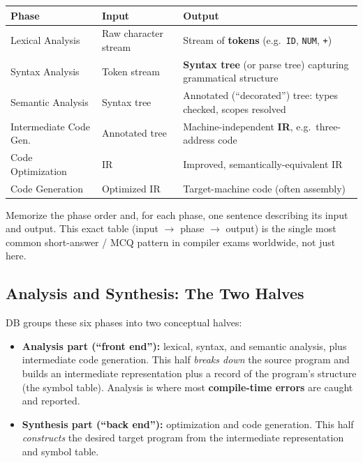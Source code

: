 \documentclass[11pt]{article}
\begin{document}
\begin{center}
\renewcommand{\arraystretch}{1.3}
\begin{tabularx}{\textwidth}{@{}l l X@{}}
\toprule
\textbf{Phase} & \textbf{Input} & \textbf{Output} \\
\midrule
Lexical Analysis & Raw character stream & Stream of \textbf{tokens} (e.g.\ \texttt{ID}, \texttt{NUM}, \texttt{+}) \\
Syntax Analysis & Token stream & \textbf{Syntax tree} (or parse tree) capturing grammatical structure \\
Semantic Analysis & Syntax tree & Annotated (``decorated'') tree: types checked, scopes resolved \\
Intermediate Code Gen. & Annotated tree & Machine-independent \textbf{IR}, e.g.\ three-address code \\
Code Optimization & IR & Improved, semantically-equivalent IR \\
Code Generation & Optimized IR & Target-machine code (often assembly) \\
\bottomrule
\end{tabularx}
\end{center}

\begin{examfocus}
Memorize the phase order and, for each phase, one sentence describing its input and output.
This exact table (input $\to$ phase $\to$ output) is the single most common short-answer /
MCQ pattern in compiler exams worldwide, not just here.
\end{examfocus}

\subsection{Analysis and Synthesis: The Two Halves}

\dbtag DB groups these six phases into two conceptual halves:

\begin{itemize}
  \item \textbf{Analysis part (``front end''):} lexical, syntax, and semantic analysis, plus
  intermediate code generation. This half \emph{breaks down} the source program and builds an
  intermediate representation plus a record of the program's structure (the symbol table).
  Analysis is where most \textbf{compile-time errors} are caught and reported.
  \item \textbf{Synthesis part (``back end''):} optimization and code generation. This half
  \emph{constructs} the desired target program from the intermediate representation and symbol
  table.
\end{itemize}
\end{document}
